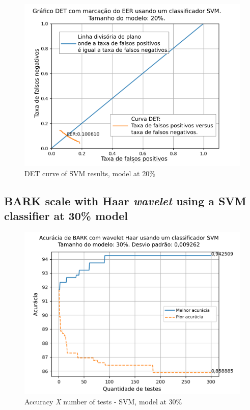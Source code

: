 \begin{figure}[h]
	\centering
	\includegraphics[width=.9\linewidth]{images/results/det/DET_SVM_20}
	\caption{DET curve of SVM results, model at 20\%}
	\label{fig:detsvm20}
\end{figure}

\subsection{BARK scale with Haar \textit{wavelet} using a SVM classifier at 30\% model}


\begin{figure}[ht]
	\centering
	\includegraphics[width=\linewidth]{images/results/confusionMatrices/classifier_SVM_30.png}
	\caption{Accuracy \textit{X} number of tests - SVM, model at 30\%}
	\label{fig:classifiersvm30}
\end{figure}

